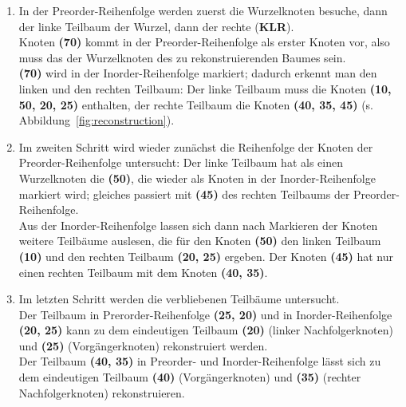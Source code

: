 \begin{enumerate}
    \item In der Preorder-Reihenfolge werden zuerst die Wurzelknoten besuche, dann der linke Teilbaum der Wurzel, dann der rechte (\textbf{KLR}).\\
    Knoten \textbf{(70)} kommt in der Preorder-Reihenfolge als erster Knoten vor, also muss das der Wurzelknoten des zu rekonstruierenden Baumes sein.\\
    \textbf{(70)} wird in der Inorder-Reihenfolge markiert; dadurch erkennt man den linken und den rechten Teilbaum: Der linke Teilbaum muss die Knoten \textbf{(10, 50, 20, 25)} enthalten, der rechte Teilbaum die Knoten \textbf{(40, 35, 45)} (s. Abbildung~\ref{fig:reconstruction}).
    \item Im zweiten Schritt wird wieder zunächst die Reihenfolge der Knoten der Preorder-Reihenfolge untersucht: Der linke Teilbaum hat als einen Wurzelknoten die \textbf{(50)}, die wieder als Knoten in der Inorder-Reihenfolge markiert wird; gleiches passiert mit \textbf{(45)} des rechten Teilbaums der Preorder-Reihenfolge.\\
    Aus der Inorder-Reihenfolge lassen sich dann nach Markieren der Knoten weitere Teilbäume auslesen, die für den Knoten \textbf{(50)} den linken Teilbaum \textbf{(10)} und den rechten Teilbaum \textbf{(20, 25)} ergeben.
    Der Knoten \textbf{(45)} hat nur einen rechten Teilbaum mit dem Knoten \textbf{(40, 35)}.
    \item Im letzten Schritt werden die verbliebenen Teilbäume untersucht.\\
    Der Teilbaum in Prerorder-Reihenfolge \textbf{(25, 20)} und in Inorder-Reihenfolge \textbf{(20, 25)} kann zu dem eindeutigen Teilbaum \textbf{(20)} (linker Nachfolgerknoten) und \textbf{(25)} (Vorgängerknoten) rekonstruiert werden.\\
    Der Teilbaum \textbf{(40, 35)} in Preorder- und Inorder-Reihenfolge lässt sich zu dem eindeutigen Teilbaum \textbf{(40)} (Vorgängerknoten) und \textbf{(35)} (rechter Nachfolgerknoten) rekonstruieren.
\end{enumerate}


